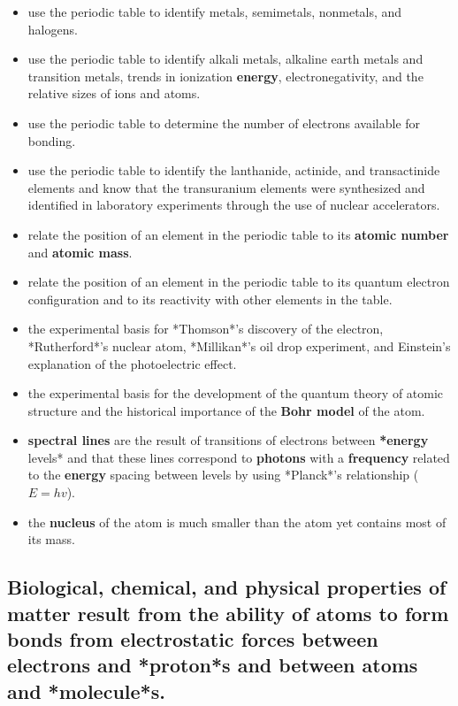 \documentclass[11pt]{article}
\begin{document}
\begin{itemize}
\item use the periodic table to identify metals, semimetals, nonmetals, and halogens.
\item use the periodic table to identify alkali metals, alkaline earth metals and transition metals, trends in ionization \textbf{energy}, electronegativity, and the relative sizes of ions and atoms.
\item use the periodic table to determine the number of electrons available for bonding.
\item use the periodic table to identify the lanthanide, actinide, and transactinide elements and know that the transuranium elements were synthesized and identified in laboratory experiments through the use of nuclear accelerators.
\item relate the position of an element in the periodic table to its \textbf{\textbf{atomic number}} and \textbf{atomic mass}.
\item relate the position of an element in the periodic table to its quantum electron configuration and to its reactivity with other elements in the table.

\item the experimental basis for *Thomson*’s discovery of the electron, *Rutherford*’s nuclear atom, *Millikan*’s oil drop experiment, and Einstein’s explanation of the photoelectric effect.
\item the experimental basis for the development of the quantum theory of atomic structure and the historical importance of the \textbf{Bohr model} of the atom.
\end{itemize}


\begin{itemize}
\item \textbf{spectral lines} are the result of transitions of electrons between \textbf{*energy} levels* and that these lines correspond to \textbf{photons} with a \textbf{frequency} related to the \textbf{energy} spacing between levels by using *Planck*’s relationship (\(E = hv\)).
\item the \textbf{nucleus} of the atom is much smaller than the atom yet contains most of its mass.
\end{itemize}
\subsection{Biological, chemical, and physical properties of matter result from the ability of atoms to form bonds from electrostatic forces between electrons and *proton*s and between atoms and *molecule*s.}
\label{sec:org844fd44}
\end{document}

